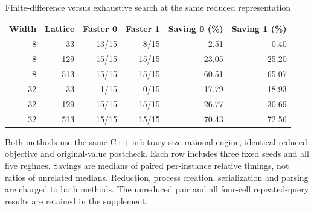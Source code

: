 \begin{table}[htbp]
\centering
\caption{Finite-difference versus exhaustive search at the same reduced representation}\label{tab:native-factorial61}
{\small\setlength{\tabcolsep}{3pt}
\begin{tabular}{rrrrrr}
\hline
Width & Lattice & Faster 0 & Faster 1 & Saving 0 (\%) & Saving 1 (\%) \\
\hline
8 & 33 & 13/15 & 8/15 & 2.51 & 0.40 \\
8 & 129 & 15/15 & 15/15 & 23.05 & 25.20 \\
8 & 513 & 15/15 & 15/15 & 60.51 & 65.07 \\
32 & 33 & 1/15 & 0/15 & -17.79 & -18.93 \\
32 & 129 & 15/15 & 15/15 & 26.77 & 30.69 \\
32 & 513 & 15/15 & 15/15 & 70.43 & 72.56 \\
\hline\end{tabular}}
\par\smallskip
{\footnotesize Both methods use the same C++ arbitrary-size rational engine, identical reduced objective and original-value postcheck. Each row includes three fixed seeds and all five regimes. Savings are medians of paired per-instance relative timings, not ratios of unrelated medians. Reduction, process creation, serialization and parsing are charged to both methods. The unreduced pair and all four-cell repeated-query results are retained in the supplement.}
\end{table}
